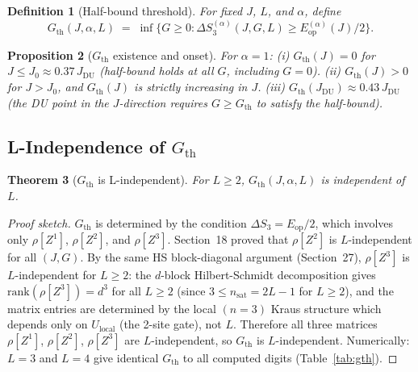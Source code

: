 \documentclass[12pt,a4paper]{article}
\newtheorem{theorem}{Theorem}[section]
\newtheorem{proposition}[theorem]{Proposition}
\newtheorem{definition}[theorem]{Definition}
\begin{document}
\begin{definition}[Half-bound threshold]
For fixed $J$, $L$, and $\alpha$, define
\[
  G_\mathrm{th}(J,\alpha,L)
  \;=\;\inf\bigl\{G\geq0 : \Delta S_3^{(\alpha)}(J,G,L)\geq E_\mathrm{op}^{(\alpha)}(J)/2\bigr\}.
\]
\end{definition}

\begin{proposition}[$G_\mathrm{th}$ existence and onset]\label{prop:gth_existence}
For $\alpha=1$:
(i) $G_\mathrm{th}(J)=0$ for $J\leq J_0\approx0.37\,J_\mathrm{DU}$
  (half-bound holds at all $G$, including $G=0$).
(ii) $G_\mathrm{th}(J)>0$ for $J>J_0$, and $G_\mathrm{th}(J)$ is
  strictly increasing in $J$.
(iii) $G_\mathrm{th}(J_\mathrm{DU})\approx0.43\,J_\mathrm{DU}$
  (the DU point in the $J$-direction requires $G\geq G_\mathrm{th}$ to satisfy the half-bound).
\end{proposition}

\subsection{L-Independence of $G_\mathrm{th}$}
\label{subsec:gth_lindep}

\begin{theorem}[$G_\mathrm{th}$ is L-independent]\label{thm:gth_lindep}
For $L\geq2$, $G_\mathrm{th}(J,\alpha,L)$ is independent of $L$.
\end{theorem}

\begin{proof}[Proof sketch]
$G_\mathrm{th}$ is determined by the condition $\Delta S_3=E_\mathrm{op}/2$, which
involves only $\rho[Z^1]$, $\rho[Z^2]$, and $\rho[Z^3]$.
Section~18 proved that $\rho[Z^2]$ is $L$-independent for all $(J,G)$.
By the same HS block-diagonal argument (Section~27), $\rho[Z^3]$ is $L$-independent
for $L\geq2$: the $d$-block Hilbert-Schmidt decomposition gives
$\mathrm{rank}(\rho[Z^3])=d^3$ for all $L\geq2$ (since $3\leq n_\mathrm{sat}=2L-1$ for $L\geq2$),
and the matrix entries are determined by the local $(n=3)$ Kraus structure which
depends only on $U_\mathrm{local}$ (the 2-site gate), not $L$.
Therefore all three matrices $\rho[Z^1]$, $\rho[Z^2]$, $\rho[Z^3]$ are $L$-independent,
so $G_\mathrm{th}$ is $L$-independent.
Numerically: $L=3$ and $L=4$ give identical $G_\mathrm{th}$ to all computed digits
(Table~\ref{tab:gth}).
\end{proof}
\end{document}
